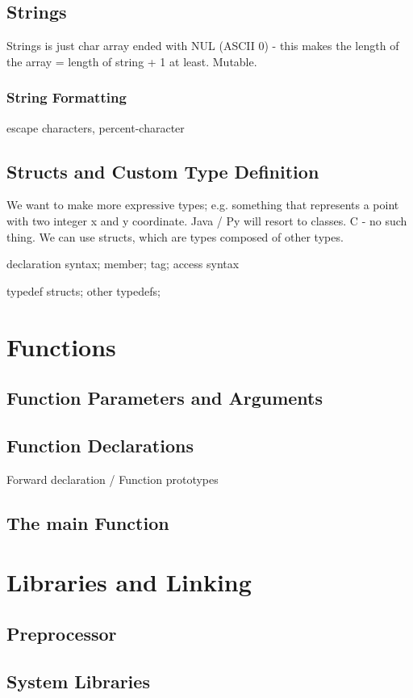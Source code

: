 \documentclass[oneside]{book}
\theoremstyle{definition}
\begin{document}
    
    \section{Strings}
    Strings is just char array ended with NUL (ASCII 0) - this makes the length of the array = length of string + 1 at least. Mutable.
        \subsection{String Formatting}
        escape characters, percent-character
    
    \section{Structs and Custom Type Definition}
    We want to make more expressive types; e.g. something that represents a point with two integer x and y coordinate. Java / Py will resort to classes. C - no such thing. We can use structs, which are types composed of other types. 

    declaration syntax; member; tag; access syntax


    typedef structs;
    other typedefs;

\chapter{Functions}
    \section{Function Parameters and Arguments}
    \section{Function Declarations}
    Forward declaration / Function prototypes
    \section{The main Function}

\chapter{Libraries and Linking}
    \section{Preprocessor}
    \section{System Libraries}
\end{document}
